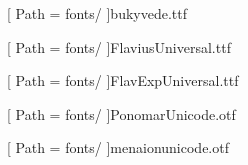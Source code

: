 \makeatletter
{}
{}
\makeatother

\usepackage[autostyle]{csquotes} %
\usepackage{totcount}
\usepackage{setspace}
\usepackage{amsmath, amsfonts, amssymb, amsthm, mathtools} %

\usepackage{fontspec}
\newfontfamily{\bukyvede}[
  Path = fonts/
]{bukyvede.ttf}

\newfontfamily{\flaviusuniversal}[
  Path = fonts/
]{FlaviusUniversal.ttf}

\newfontfamily{\flavexp}[
  Path = fonts/
]{FlavExpUniversal.ttf}

\newfontfamily{\ponomarunicode}[
  Path = fonts/
]{PonomarUnicode.otf}

\newfontfamily{\menaionunicode}[
  Path = fonts/
]{menaionunicode.otf}
